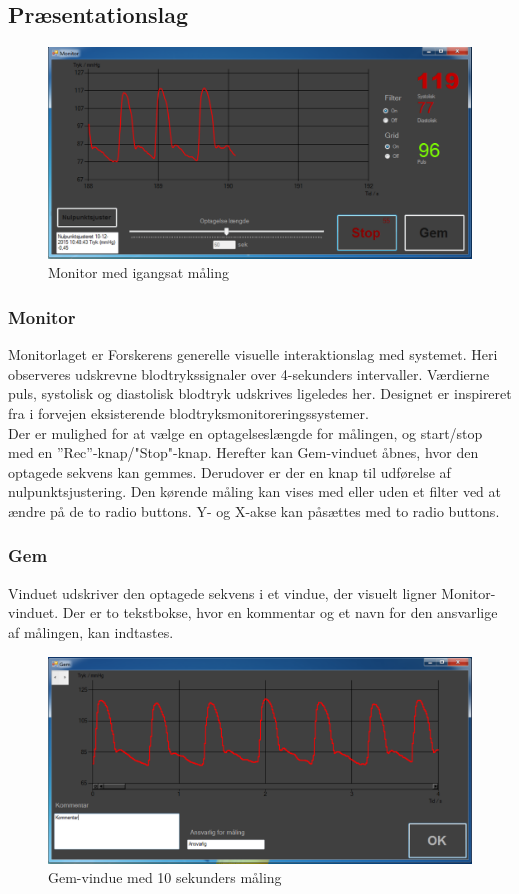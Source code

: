 \subsection{Præsentationslag}
\begin{figure}[H]
	\centering
	\includegraphics[width=1\textwidth]{Figurer/Monitor_vindue_Recording}
	\caption{Monitor med igangsat måling}
\end{figure}

\subsubsection{Monitor}
Monitorlaget er Forskerens generelle visuelle interaktionslag med systemet. Heri observeres udskrevne blodtrykssignaler over 4-sekunders intervaller. Værdierne puls, systolisk og diastolisk blodtryk udskrives ligeledes her. Designet er inspireret fra i forvejen eksisterende blodtryksmonitoreringssystemer. \\
Der er mulighed for at vælge en optagelseslængde for målingen, og start/stop med en ”Rec”\--knap/"Stop"\--knap. Herefter kan Gem-vinduet åbnes, hvor den optagede sekvens kan gemmes. Derudover er der en knap til udførelse af nulpunktsjustering. Den kørende måling kan vises med eller uden et filter ved at ændre på de to radio buttons. Y- og X-akse kan påsættes med to radio buttons. 

\subsubsection{Gem}
Vinduet udskriver den optagede sekvens i et vindue, der visuelt ligner Monitor-vinduet. Der er to tekstbokse, hvor en kommentar og et navn for den ansvarlige af målingen, kan indtastes.
\begin{figure}[H]
	\centering
	\includegraphics[width=1\textwidth]{Figurer/Gem}
	\caption{Gem-vindue med 10 sekunders måling}
\end{figure}

